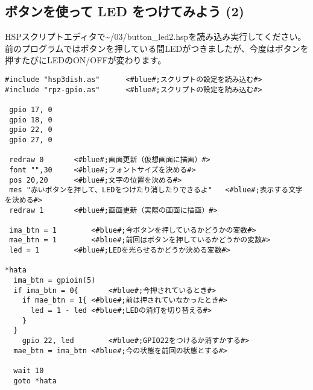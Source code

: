 \subsection{ボタンを使って LED をつけてみよう (2)}
HSPスクリプトエディタで\textasciitilde /03/button\_led2.hspを読み込み実行してください。前のプログラムではボタンを押している間LEDがつきましたが、今度はボタンを押すたびにLEDのON/OFFが変わります。\\

\begin{lstlisting}[caption=button\_led2.hsp,label=button_led2.hsp]
#include "hsp3dish.as"		<#blue#;スクリプトの設定を読み込む#>
#include "rpz-gpio.as"		<#blue#;スクリプトの設定を読み込む#>

 gpio 17, 0
 gpio 18, 0
 gpio 22, 0
 gpio 27, 0
	
 redraw 0		<#blue#;画面更新（仮想画面に描画）#>
 font "",30		<#blue#;フォントサイズを決める#>
 pos 20,20		<#blue#;文字の位置を決める#>
 mes "赤いボタンを押して、LEDをつけたり消したりできるよ"	<#blue#;表示する文字を決める#>
 redraw 1		<#blue#;画面更新（実際の画面に描画）#>

 ima_btn = 1		<#blue#;今ボタンを押しているかどうかの変数#>
 mae_btn = 1		<#blue#;前回はボタンを押しているかどうかの変数#>
 led = 1		<#blue#;LEDを光らせるかどうか決める変数#>

*hata
  ima_btn = gpioin(5)
  if ima_btn = 0{		<#blue#;今押されているとき#>
    if mae_btn = 1{	<#blue#;前は押されていなかったとき#>
      led = 1 - led	<#blue#;LEDの消灯を切り替える#>
    }
  }
    gpio 22, led		<#blue#;GPIO22をつけるか消すかする#>
  mae_btn = ima_btn	<#blue#;今の状態を前回の状態とする#>

  wait 10
  goto *hata
\end{lstlisting}

